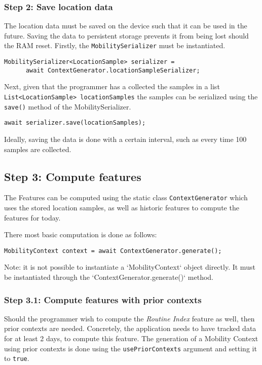 \subsubsection*{Step 2: Save location data}
The location data must be saved on the device such that it can be used in the future. Saving the data to persistent storage prevents it from being lost should the RAM reset. Firstly, the \verb|MobilitySerializer| must be instantiated.

\begin{verbatim}
MobilitySerializer<LocationSample> serializer =
      await ContextGenerator.locationSampleSerializer;
\end{verbatim}

Next, given that the programmer has a collected the samples in a list \verb|List<LocationSample> locationSamples| the samples can be serialized using the \verb|save()| method of the MobilitySerializer.

\begin{verbatim}
await serializer.save(locationSamples);
\end{verbatim}

Ideally, saving the data is done with a certain interval, such as every time 100 samples are collected. 

\subsection*{Step 3: Compute features}
The Features can be computed using the static class \verb|ContextGenerator| which uses the stored location samples, as well as historic features to compute the features for today.

There most basic computation is done as follows:
\begin{verbatim}
MobilityContext context = await ContextGenerator.generate();
\end{verbatim}

Note: it is not possible to instantiate a `MobilityContext` object directly. 
It must be instantiated through the `ContextGenerator.generate()` method.

\subsubsection*{Step 3.1: Compute features with prior contexts}
Should the programmer wish to compute the \textit{Routine Index} feature as well, then prior contexts are needed. Concretely, the application needs to have tracked data for at least 2 days, to compute this feature. The generation of a Mobility Context using prior contexts is done using the \verb|usePriorContexts| argument and setting it to \verb|true|.

